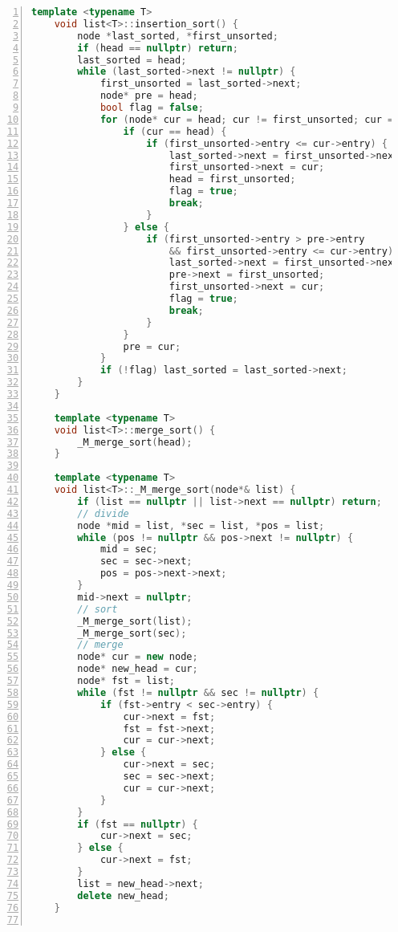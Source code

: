 \documentclass{article}
\begin{document}
\begin{lstlisting}[xleftmargin = 2em,xrightmargin = 2em, aboveskip = 0.5em, numbers = left, language = C++]
    template <typename T>
    void list<T>::insertion_sort() {
        node *last_sorted, *first_unsorted;
        if (head == nullptr) return;
        last_sorted = head;
        while (last_sorted->next != nullptr) {
            first_unsorted = last_sorted->next;
            node* pre = head;
            bool flag = false;
            for (node* cur = head; cur != first_unsorted; cur = cur->next) {
                if (cur == head) {
                    if (first_unsorted->entry <= cur->entry) {
                        last_sorted->next = first_unsorted->next;
                        first_unsorted->next = cur;
                        head = first_unsorted;
                        flag = true;
                        break;
                    }
                } else {
                    if (first_unsorted->entry > pre->entry
                        && first_unsorted->entry <= cur->entry) {
                        last_sorted->next = first_unsorted->next;
                        pre->next = first_unsorted;
                        first_unsorted->next = cur;
                        flag = true;
                        break;
                    }
                }
                pre = cur;
            }
            if (!flag) last_sorted = last_sorted->next;
        }
    }

    template <typename T>
    void list<T>::merge_sort() {
        _M_merge_sort(head);
    }

    template <typename T>
    void list<T>::_M_merge_sort(node*& list) {
        if (list == nullptr || list->next == nullptr) return;
        // divide
        node *mid = list, *sec = list, *pos = list;
        while (pos != nullptr && pos->next != nullptr) {
            mid = sec;
            sec = sec->next;
            pos = pos->next->next;
        }
        mid->next = nullptr;
        // sort
        _M_merge_sort(list);
        _M_merge_sort(sec);
        // merge
        node* cur = new node;
        node* new_head = cur;
        node* fst = list;
        while (fst != nullptr && sec != nullptr) {
            if (fst->entry < sec->entry) {
                cur->next = fst;
                fst = fst->next;
                cur = cur->next;
            } else {
                cur->next = sec;
                sec = sec->next;
                cur = cur->next;
            }
        }
        if (fst == nullptr) {
            cur->next = sec;
        } else {
            cur->next = fst;
        }
        list = new_head->next;
        delete new_head;
    }


\end{lstlisting}
\end{document}
